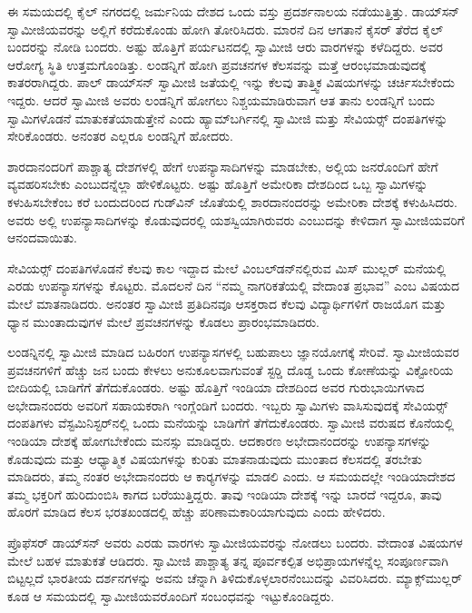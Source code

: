  ಈ ಸಮಯದಲ್ಲಿ ಕೈಲ್ ನಗರದಲ್ಲಿ ಜರ್ಮನಿಯ ದೇಶದ ಒಂದು ವಸ್ತು ಪ್ರದರ್ಶನಾಲಯ ನಡೆಯುತ್ತಿತ್ತು. ಡಾಯ್‍ಸನ್‍ ಸ್ವಾಮೀಜಿಯವರನ್ನು ಅಲ್ಲಿಗೆ ಕರೆದುಕೊಂಡು ಹೋಗಿ ತೋರಿಸಿದರು. ಮಾರನೆ ದಿನ ಆಗತಾನೆ ಕೈಸರ್ ತೆರೆದ ಕೈಲ್ ಬಂದರನ್ನು ನೋಡಿ ಬಂದರು. ಅಷ್ಟು ಹೊತ್ತಿಗೆ ಪರ್ಯಟನದಲ್ಲಿ ಸ್ವಾಮೀಜಿ ಆರು ವಾರಗಳನ್ನು ಕಳೆದಿದ್ದರು. ಅವರ ಆರೋಗ್ಯ ಸ್ಥಿತಿ ಉತ್ತಮಗೊಂಡಿತ್ತು. ಲಂಡನ್ನಿಗೆ ಹೋಗಿ ಪ್ರವಚನಗಳ ಕೆಲಸವನ್ನು ಮತ್ತೆ ಆರಂಭಮಾಡುವುದಕ್ಕೆ ಕಾತರರಾಗಿದ್ದರು. ಪಾಲ್ ಡಾಯ್‍ಸನ್‍ ಸ್ವಾಮೀಜಿ ಜತೆಯಲ್ಲಿ ಇನ್ನು ಕೆಲವು ತಾತ್ತ್ವಿಕ ವಿಷಯಗಳನ್ನು ಚರ್ಚಿಸಬೇಕೆಂದು ಇದ್ದರು. ಆದರೆ ಸ್ವಾಮೀಜಿ ಅವರು ಲಂಡನ್ನಿಗೆ ಹೋಗಲು ನಿಶ್ಚಯಮಾಡಿರುವಾಗ ಆತ ತಾನು ಲಂಡನ್ನಿಗೆ ಬಂದು ಸ್ವಾಮಿಗಳೊಡನೆ ಮಾತುಕತೆಯಾಡುತ್ತೇನೆ ಎಂದು ಹ್ಯಾಮ್‍ಬರ್ಗಿನಲ್ಲಿ ಸ್ವಾಮೀಜಿ ಮತ್ತು ಸೇವಿಯರ್ಸ್‍‍ ದಂಪತಿಗಳನ್ನು ಸೇರಿಕೊಂಡರು. ಅನಂತರ ಎಲ್ಲರೂ ಲಂಡನ್ನಿಗೆ ಹೋದರು. 

 ಶಾರದಾನಂದರಿಗೆ ಪಾಶ್ಚಾತ್ಯ ದೇಶಗಳಲ್ಲಿ ಹೇಗೆ ಉಪನ್ಯಾಸಾದಿಗಳನ್ನು ಮಾಡಬೇಕು, ಅಲ್ಲಿಯ ಜನರೊಂದಿಗೆ ಹೇಗೆ ವ್ಯವಹರಿಸಬೇಕು ಎಂಬುದನ್ನೆಲ್ಲಾ ಹೇಳಿಕೊಟ್ಟರು. ಅಷ್ಟು ಹೊತ್ತಿಗೆ ಅಮೇರಿಕಾ ದೇಶದಿಂದ ಒಬ್ಬ ಸ್ವಾಮಿಗಳನ್ನು ಕಳುಹಿಸಬೇಕೆಂಬ ಕರೆ ಬಂದುದರಿಂದ ಗುಡ್‍ವಿನ್ ಜೊತೆಯಲ್ಲಿ ಶಾರದಾನಂದರನ್ನು ಅಮೇರಿಕಾ ದೇಶಕ್ಕೆ ಕಳುಹಿಸಿದರು. ಅವರು ಅಲ್ಲಿ ಉಪನ್ಯಾಸಾದಿಗಳನ್ನು ಕೊಡುವುದರಲ್ಲಿ ಯಶಸ್ವಿಯಾಗಿರುವರು ಎಂಬುದನ್ನು ಕೇಳಿದಾಗ ಸ್ವಾಮೀಜಿಯವರಿಗೆ ಆನಂದವಾಯಿತು. 

 ಸೇವಿಯರ್ಸ್‍‍ ದಂಪತಿಗಳೊಡನೆ ಕೆಲವು ಕಾಲ ಇದ್ದಾದ ಮೇಲೆ ವಿಂಬಲ್‍ಡನ್‍ನಲ್ಲಿರುವ ಮಿಸ್ ಮುಲ್ಲರ್ ಮನೆಯಲ್ಲಿ ಎರಡು ಉಪನ್ಯಾಸಗಳನ್ನು ಕೊಟ್ಟರು. ಮೊದಲನೆ ದಿನ “ನಮ್ಮ ನಾಗರಿಕತೆಯಲ್ಲಿ ವೇದಾಂತ ಪ್ರಭಾವ” ಎಂಬ ವಿಷಯದ ಮೇಲೆ ಮಾತನಾಡಿದರು. ಅನಂತರ ಸ್ವಾಮೀಜಿ ಪ್ರತಿದಿನವೂ ಆಸಕ್ತರಾದ ಕೆಲವು ವಿದ್ಯಾರ್ಥಿಗಳಿಗೆ ರಾಜಯೊಗ ಮತ್ತು ಧ್ಯಾನ ಮುಂತಾದುವುಗಳ ಮೇಲೆ ಪ್ರವಚನಗಳನ್ನು ಕೊಡಲು ಪ್ರಾರಂಭಮಾಡಿದರು. 

 ಲಂಡನ್ನಿನಲ್ಲಿ ಸ್ವಾಮೀಜಿ ಮಾಡಿದ ಬಹಿರಂಗ ಉಪನ್ಯಾಸಗಳಲ್ಲಿ ಬಹುಪಾಲು ಜ್ಞಾನಯೋಗಕ್ಕೆ ಸೇರಿವೆ. ಸ್ವಾಮೀಜಿಯವರ ಪ್ರವಚನಗಳಿಗೆ ಹೆಚ್ಚು ಜನ ಬಂದು ಕೇಳಲು ಅನುಕೂಲವಾಗುವಂತೆ ಸ್ಟರ‍್ಡಿ ದೊಡ್ಡ ಒಂದು ಕೋಣೆಯನ್ನು ವಿಕ್ಟೋರಿಯ ಬೀದಿಯಲ್ಲಿ ಬಾಡಿಗೆಗೆ ತೆಗೆದುಕೊಂಡರು. ಅಷ್ಟು ಹೊತ್ತಿಗೆ ಇಂಡಿಯಾ ದೇಶದಿಂದ ಅವರ ಗುರುಭಾಯಿಗಳಾದ ಅಭೇದಾನಂದರು ಅವರಿಗೆ ಸಹಾಯಕರಾಗಿ ಇಂಗ್ಲೆಂಡಿಗೆ ಬಂದರು. ಇಬ್ಬರು ಸ್ವಾಮಿಗಳು ವಾಸಿಸುವುದಕ್ಕೆ ಸೇವಿಯರ್ಸ್‍‍ ದಂಪತಿಗಳು ವೆಸ್ಟಮಿನಿಸ್ಟರ್‌ನಲ್ಲಿ ಒಂದು ಮನೆಯನ್ನು ಬಾಡಿಗೆಗೆ ತೆಗೆದುಕೊಂಡರು. ಸ್ವಾಮೀಜಿ ವರುಷದ ಕೊನೆಯಲ್ಲಿ ಇಂಡಿಯಾ ದೇಶಕ್ಕೆ ಹೋಗಬೇಕೆಂದು ಮನಸ್ಸು ಮಾಡಿದ್ದರು. ಆದಕಾರಣ ಅಭೇದಾನಂದರನ್ನು ಉಪನ್ಯಾಸಗಳನ್ನು ಕೊಡುವುದು ಮತ್ತು ಆಧ್ಯಾತ್ಮಿಕ ವಿಷಯಗಳನ್ನು ಕುರಿತು ಮಾತನಾಡುವುದು ಮುಂತಾದ ಕೆಲಸದಲ್ಲಿ ತರಬೇತು ಮಾಡಿದರು, ತಮ್ಮ ನಂತರ ಅಭೇದಾನಂದರು ಆ ಕಾರ‍್ಯಗಳನ್ನು ಮಾಡಲಿ ಎಂದು. ಆ ಸಮಯದಲ್ಲೇ ಇಂಡಿಯಾದೇಶದ ತಮ್ಮ ಭಕ್ತರಿಗೆ ಹುರಿದುಂಬಿಸಿ ಕಾಗದ ಬರೆಯುತ್ತಿದ್ದರು. ತಾವು ಇಂಡಿಯಾ ದೇಶಕ್ಕೆ ಇನ್ನು ಬಾರದೆ ಇದ್ದರೂ, ತಾವು ಹೊರಗೆ ಮಾಡಿದ ಕೆಲಸ ಭರತಖಂಡದಲ್ಲಿ ಹೆಚ್ಚು ಪರಿಣಾಮಕಾರಿಯಾಗುವುದು ಎಂದು ಹೇಳಿದರು. 

 ಪ್ರೊಫೆಸರ್ ಡಾಯ್‍ಸನ್‍ ಅವರು ಎರಡು ವಾರಗಳು ಸ್ವಾಮೀಜಿಯವರನ್ನು ನೋಡಲು ಬಂದರು. ವೇದಾಂತ ವಿಷಯಗಳ ಮೇಲೆ ಬಹಳ ಮಾತುಕತೆ ಆಡಿದರು. ಸ್ವಾಮೀಜಿ ಪಾಶ್ಚಾತ್ಯ ತನ್ನ ಪೂರ್ವಕಲ್ಪಿತ ಅಭಿಪ್ರಾಯಗಳನ್ನೆಲ್ಲ ಸಂಪೂರ್ಣವಾಗಿ ಬಿಟ್ಟಲ್ಲದೆ ಭಾರತೀಯ ದರ್ಶನಗಳನ್ನು ಅವನು ಚೆನ್ನಾಗಿ ತಿಳಿದುಕೊಳ್ಳಲಾರನೆಂಬುದನ್ನು ವಿವರಿಸಿದರು. ಮ್ಯಾಕ್ಸ್‌ಮುಲ್ಲರ್ ಕೂಡ ಆ ಸಮಯದಲ್ಲಿ ಸ್ವಾಮೀಜಿಯವರೊಂದಿಗೆ ಸಂಬಂಧವನ್ನು ಇಟ್ಟುಕೊಂಡಿದ್ದರು. 

